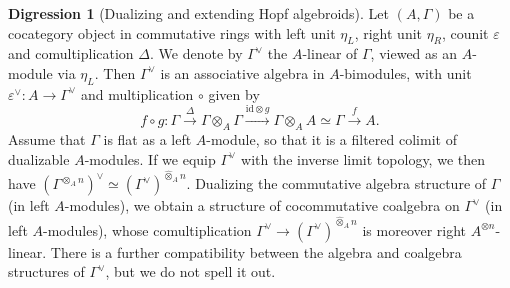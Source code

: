 \documentclass{amsart}
\numberwithin{equation}{section}
\theoremstyle{plain}
\theoremstyle{definition}
\newtheorem{digression}[equation]{Digression}
\def\id{\mathrm{id}}
\def\hatotimes{\mathbin{\widehat\otimes}}
\let\epsilon=\varepsilon
\begin{document}
\begin{digression}[Dualizing and extending Hopf algebroids]
	Let $(A,\Gamma)$ be a cocategory object in commutative rings with left unit $\eta_L$, right unit $\eta_R$, counit $\epsilon$ and comultiplication $\Delta$. We denote by $\Gamma^\vee$ the $A$-linear of $\Gamma$, viewed as an $A$-module via $\eta_L$.
	Then $\Gamma^\vee$ is an associative algebra in $A$-bimodules, with unit $\epsilon^\vee\colon A\to \Gamma^\vee$ and multiplication $\circ$ given by
	\[
	f\circ g\colon \Gamma \xrightarrow{\Delta} \Gamma\otimes_A\Gamma \xrightarrow{\id\otimes g} \Gamma\otimes_AA\simeq \Gamma \xrightarrow{f} A.
	\]
	Assume that $\Gamma$ is flat as a left $A$-module, so that it is a filtered colimit of dualizable $A$-modules.
	If we equip $\Gamma^\vee$ with the inverse limit topology, we then have $(\Gamma^{\otimes_A n})^\vee \simeq (\Gamma^\vee)^{\hatotimes_A n}$. Dualizing the commutative algebra structure of $\Gamma$ (in left $A$-modules), we obtain a structure of cocommutative coalgebra on $\Gamma^\vee$ (in left $A$-modules), whose comultiplication $\Gamma^\vee \to (\Gamma^\vee)^{\hatotimes_A n}$ is moreover right $A^{\otimes n}$-linear.
	There is a further compatibility between the algebra and coalgebra structures of $\Gamma^\vee$, but we do not spell it out.


\end{digression}
\end{document}

